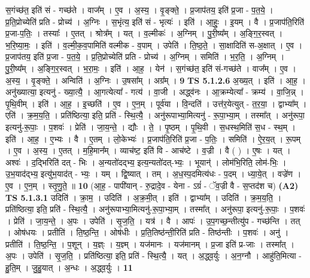 \documentclass[17pt]{extarticle}
\begin{document}
                  स॒गंच्छ॑त॒ इति॑ सं - गच्छ॑ते । वाज᳚म् । ए॒व । अ॒स्य॒ । वृ॒ङ्क्ते॒ । प्र॒जाप॑तय॒ इति॑ प्र॒जा - प॒त॒ये॒ । प्र॒ति॒प्रोच्येति॑ प्रति - प्रोच्य॑ । अ॒ग्निः । स॒भृंत्य॒ इति॑ सं - भृत्यः॑ । इति॑ । आ॒हुः॒ । इ॒यम् । वै । प्र॒जाप॑ति॒रिति॑ प्र॒जा-प॒तिः॒ । तस्याः᳚ । ए॒तत् । श्रोत्र᳚म् । यत् । व॒ल्मीकः॑ । अ॒ग्निम् । पु॒री॒ष्य᳚म् । अ॒ङ्गि॒र॒स्वत् । भ॒रि॒ष्या॒मः॒ । इति॑ । व॒ल्मी॒क॒व॒पामिति॑ वल्मीक - व॒पाम् । उपेति॑ । ति॒ष्ठ॒ते॒ । सा॒क्षादिति॑ स-अ॒क्षात् । ए॒व । प्र॒जाप॑तय॒ इति॑ प्र॒जा - प॒त॒ये॒ । प्र॒ति॒प्रोच्येति॑ प्रति - प्रोच्य॑ । अ॒ग्निम् । समिति॑ । भ॒र॒ति॒ । अ॒ग्निम् । पु॒री॒ष्य᳚म् । अ॒ङ्गि॒र॒स्वत् । भ॒रा॒मः॒ । इति॑ । आ॒ह॒ । येन॑ । स॒गंच्छ॑त॒ इति॑ सं-गच्छ॑ते । वाज᳚म् । ए॒व । अ॒स्य॒ । वृ॒ङ्क्ते॒ । अन्विति॑ । अ॒ग्निः । उ॒षसा᳚म् । अग्र᳚म् । \textbf{  9} \newline
                  \newline
                                \textbf{ TS 5.1.2.6} \newline
                  अ॒ख्य॒त् । इति॑ । आ॒ह॒ । अनु॑ख्यात्या॒ इत्यनु॑ - ख्या॒त्यै॒ । आ॒गत्येत्या᳚ - गत्य॑ । वा॒जी । अद्ध्व॑नः । आ॒क्रम्येत्या᳚ - क्रम्य॑ । वा॒जि॒न्न् । पृ॒थि॒वीम् । इति॑ । आ॒ह॒ । इ॒च्छति॑ । ए॒व । ए॒न॒म् । पूर्व॑या । वि॒न्दति॑ । उत्त॑र॒येत्युत् - त॒र॒या॒ । द्वाभ्या᳚म् । एति॑ । क्र॒म॒य॒ति॒ । प्रति॑ष्ठित्या॒ इति॒ प्रति॑ - स्थि॒त्यै॒ । अनु॑रूपाभ्या॒मित्यनु॑ - रू॒पा॒भ्या॒म् । तस्मा᳚त् । अनु॑रूपा॒ इत्यनु॑-रू॒पाः॒ । प॒शवः॑ । प्रेति॑ । जा॒य॒न्ते॒ । द्यौः । ते॒ । पृ॒ष्ठम् । पृ॒थि॒वी । स॒धस्थ॒मिति॑ स॒ध - स्थ॒म् । इति॑ । आ॒ह॒ । ए॒भ्यः । वै । ए॒तम् । लो॒केभ्यः॑ । प्र॒जाप॑ति॒रिति॑ प्र॒जा - प॒तिः॒ । समिति॑ । ऐ॒र॒य॒त् । रू॒पम् । ए॒व । अ॒स्य॒ । ए॒तत् । म॒हि॒मान᳚म् । व्याच॑ष्ट॒ इति॑ वि - आच॑ष्टे । व॒ज्री । वै ( ) । ए॒षः । यत् । अश्वः॑ । द॒द्भिरिति॑ दत् - भिः । अ॒न्यतो॑दद्भ्य॒ इत्य॒न्यतो॑दत्-भ्यः॒ । भूयान्॑ । लोम॑भि॒रिति॒ लोम॑-भिः॒ । उ॒भ॒याद॑द्भ्य॒ इत्यु॑भ॒याद॑त् - भ्यः॒ । यम् । द्वि॒ष्यात् । तम् । अ॒ध॒स्प॒दमित्य॑धः - प॒दम् । ध्या॒ये॒त् । वज्रे॑ण । ए॒व । ए॒न॒म् । स्तृ॒णु॒ते॒ ॥ \textbf{  10 } \newline
                  \newline
                      (आ॒ह॒ - पापी॑यान् - रु॒द्रादे॒व - येना - ऽग्रं॑ - ॅव॒ज्री वै - स॒प्तद॑श च)  \textbf{(A2)} \newline \newline
                                \textbf{ TS 5.1.3.1} \newline
                  उदिति॑ । क्रा॒म॒ । उदिति॑ । अ॒क्र॒मी॒त् । इति॑ । द्वाभ्या᳚म् । उदिति॑ । क्र॒म॒य॒ति॒ । प्रति॑ष्ठित्या॒ इति॒ प्रति॑ - स्थि॒त्यै॒ । अनु॑रूपाभ्या॒मित्यनु॑-रू॒पा॒भ्या॒म् । तस्मा᳚त् । अनु॑रूपा॒ इत्यनु॑-रू॒पाः॒ । प॒शवः॑ । प्रेति॑ । जा॒य॒न्ते॒ । अ॒पः । उपेति॑ । सृ॒ज॒ति॒ । यत्र॑ । वै । आपः॑ । उ॒प॒गच्छ॒न्तीत्यु॑प - गच्छ॑न्ति । तत् । ओष॑धयः । प्रतीति॑ । ति॒ष्ठ॒न्ति॒ । ओष॑धीः । प्र॒ति॒तिष्ठ॑न्ती॒रिति॑ प्रति - तिष्ठ॑न्तीः । प॒शवः॑ । अनु॑ । प्रतीति॑ । ति॒ष्ठ॒न्ति॒ । प॒शून् । य॒ज्ञ्ः । य॒ज्ञ्म् । यज॑मानः । यज॑मानम् । प्र॒जा इति॑ प्र-जाः । तस्मा᳚त् । अ॒पः । उपेति॑ । सृ॒ज॒ति॒ । प्रति॑ष्ठित्या॒ इति॒ प्रति॑ - स्थि॒त्यै॒ । यत् । अ॒द्ध्व॒र्युः । अ॒न॒ग्नौ । आहु॑ति॒मित्या - हु॒ति॒म् । जु॒हु॒यात् । अ॒न्धः । अ॒द्ध्व॒र्युः । \textbf{  11} \newline
\end{document}
